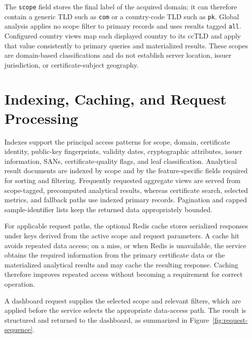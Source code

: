 The \texttt{scope} field stores the final label of the acquired domain; it can
therefore contain a generic TLD such as \texttt{com} or a country-code TLD such
as \texttt{pk}. Global analysis applies no scope filter to primary records and
uses results tagged \texttt{all}. Configured country views map each displayed
country to its ccTLD and apply that value consistently to primary queries and
materialized results. These scopes are domain-based classifications and do not
establish server location, issuer jurisdiction, or certificate-subject
geography.

\section{Indexing, Caching, and Request Processing}
\label{sec:index-cache-strategy}

Indexes support the principal access patterns for scope, domain, certificate
identity, public-key fingerprints, validity dates, cryptographic attributes,
issuer information, SANs, certificate-quality flags, and leaf
classification. Analytical result documents are indexed by scope and by the
feature-specific fields required for sorting and filtering. Frequently
requested aggregate views are served from scope-tagged, precomputed analytical
results, whereas certificate search, selected metrics, and fallback paths use
indexed primary records. Pagination and capped sample-identifier lists keep
the returned data appropriately bounded.

For applicable request paths, the optional Redis cache stores serialized
responses under keys derived from the active scope and request parameters. A
cache hit avoids repeated data access; on a miss, or when Redis is unavailable,
the service obtains the required information from the primary certificate data
or the materialized analytical results and may cache the resulting response.
Caching therefore improves repeated access without becoming a requirement for
correct operation.

A dashboard request supplies the selected scope and relevant filters, which
are applied before the service selects the appropriate data-access path. The
result is structured and returned to the dashboard, as summarized in
Figure~\ref{fig:request-sequence}.

